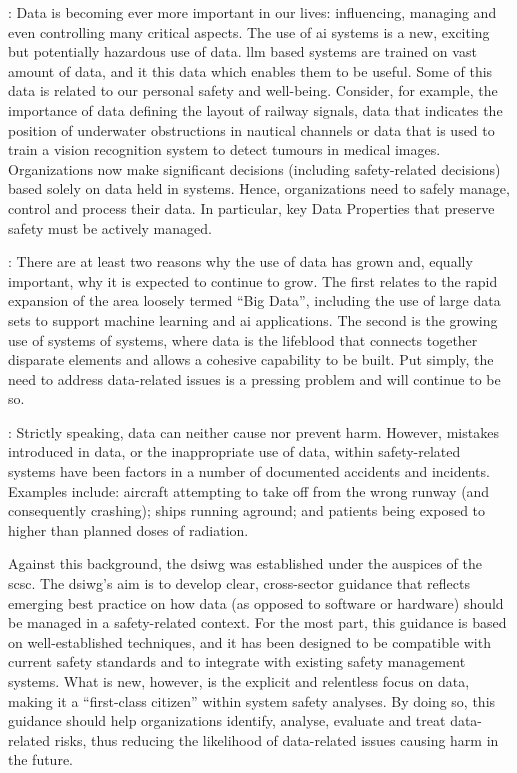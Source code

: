 :
Data is becoming ever more important in our lives: influencing, managing and even controlling many critical aspects.
The use of \gls{ai} systems is a new, exciting but potentially hazardous use of data. \acrfull{llm} based systems are trained on vast amount of data, and it this data which enables them to be useful.
Some of this data is related to our personal safety and well-being.
Consider, for example, the importance of data defining the layout of railway signals,
data that indicates the position of underwater obstructions in nautical channels or data that
is used to train a vision recognition system to detect tumours in medical images.
Organizations now make significant decisions (including safety-related decisions) based solely on data held in systems.
Hence, organizations need to safely manage, control and process their data.
In particular, key Data Properties that preserve safety must be actively managed.

: There are at least two reasons why the use of data has grown and, equally important, why it is expected to continue to grow. The  first relates to the rapid expansion of the area loosely termed ``Big Data'', including the use of large data sets to support machine learning and \gls{ai} applications. The second is the growing use of systems of systems, where data is the lifeblood that connects together disparate elements and allows a cohesive capability to be built. Put simply, the need to address data-related issues is a pressing problem and will continue to be so.

: Strictly speaking,
data can neither cause nor prevent harm.
However, mistakes introduced in data, or the inappropriate use of data, within safety-related systems have been factors in a number of documented accidents and incidents. Examples include: aircraft attempting to take off from the wrong runway (and consequently crashing); ships running aground; and patients being exposed to higher than planned doses of radiation.

Against this background, the \gls{dsiwg} was established under the auspices of the \gls{scsc}. The \gls{dsiwg}'s aim is to develop clear, cross-sector guidance that reflects emerging best practice on how data (as opposed to software or hardware) should be managed in a safety-related context.
For the most part, this guidance is based on well-established techniques,
and it has been designed to be compatible with current safety standards and to integrate with existing safety management systems.
What is new, however, is the explicit and relentless focus on data, making it a ``first-class citizen'' within system safety analyses.
By doing so, this guidance should help organizations identify, analyse, evaluate and treat data-related risks, thus reducing the likelihood of data-related issues causing harm in the future.

